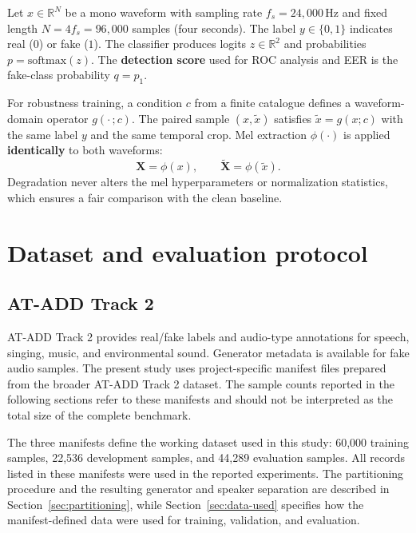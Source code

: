 Let $x \in \mathbb{R}^{N}$ be a mono waveform with sampling rate $f_s = 24{,}000$\,Hz and fixed length $N = 4 f_s = 96{,}000$ samples (four seconds). The label $y \in \{0,1\}$ indicates real ($0$) or fake ($1$). The classifier produces logits $z \in \mathbb{R}^2$ and probabilities $p = \mathrm{softmax}(z)$. The \textbf{detection score} used for ROC analysis and EER is the fake-class probability $q = p_1$.

For robustness training, a condition $c$ from a finite catalogue defines a waveform-domain operator $g(\cdot\,; c)$. The paired sample $(x, \tilde{x})$ satisfies $\tilde{x} = g(x; c)$ with the same label $y$ and the same temporal crop. Mel extraction $\phi(\cdot)$ is applied \textbf{identically} to both waveforms:
\begin{equation}
\mathbf{X} = \phi(x), \qquad \tilde{\mathbf{X}} = \phi(\tilde{x}).
\label{eq:pair}
\end{equation}
Degradation never alters the mel hyperparameters or normalization statistics, which ensures a fair comparison with the clean baseline.

\section{Dataset and evaluation protocol}
\label{sec:data}

\subsection{AT-ADD Track 2}
\label{sec:data-track2}

AT-ADD Track 2 provides real/fake labels and audio-type annotations for speech, singing, music, and environmental sound. Generator metadata is available for fake audio samples. The present study uses project-specific manifest files prepared from the broader AT-ADD Track 2 dataset. The sample counts reported in the following sections refer to these manifests and should not be interpreted as the total size of the complete benchmark.

The three manifests define the working dataset used in this study: 60,000 training samples, 22,536 development samples, and 44,289 evaluation samples. All records listed in these manifests were used in the reported experiments. The partitioning procedure and the resulting generator and speaker separation are described in Section~\ref{sec:partitioning}, while Section~\ref{sec:data-used} specifies how the manifest-defined data were used for training, validation, and evaluation.

